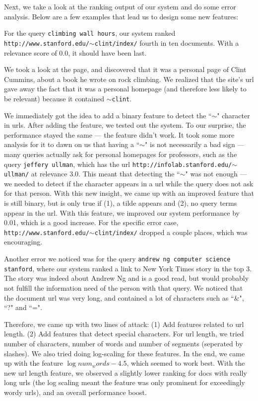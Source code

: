 \documentclass[10pt,twocolumn]{article}
\begin{document}
Next, we take a look at the ranking output of our system and do some error analysis. Below are a few examples that lead us to design some new features:

For the query \texttt{climbing wall hours}, our system ranked \texttt{http://www.stanford.edu/$\sim$clint/index/} fourth in ten documents. With a relevance score of 0.0, it should have been last.

We took a look at the page, and discovered that it was a personal page of Clint Cummins, about a book he wrote on rock climbing. We realized that the site's url gave away the fact that it was a personal homepage (and therefore less likely to be relevant) because it contained \texttt{$\sim$clint}.

We immediately got the idea to add a binary feature to detect the ``$\sim$" character in urls. After adding the feature, we tested out the system. To our surprise, the performance stayed the same --- the feature didn't work. It took some more analysis for it to dawn on us that having a ``$\sim$" is not necessarily a bad sign --- many queries actually ask for personal homepages for professors, such as the query \texttt{jeffery ullman}, which has the url \texttt{http://infolab.stanford.edu/$\sim$ullman/} at relevance 3.0. This meant that detecting the ``$\sim$" was not enough --- we needed to detect if the character appears in a url while the query does not ask for that person. With this new insight, we came up with an improved feature that is still binary, but is only true if (1), a tilde appears and (2), no query terms appear in the url. With this feature, we improved our system performance by 0.01, which is a good increase. For the specific error case, \texttt{http://www.stanford.edu/$\sim$clint/index/} dropped a couple places, which was encouraging. 

Another error we noticed was for the query \texttt{andrew ng computer science stanford}, where our system ranked a link to New York Times story in the top 3. The story was indeed about Andrew Ng and is a good read, but would probably not fulfill the information need of the person with that query. We noticed that the document url was very long, and contained a lot of characters such as ``\&", ``?" and ``=".

Therefore, we came up with two lines of attack: (1) Add features related to url length. (2) Add features that detect special characters. For url length, we tried number of characters, number of words and number of segments (seperated by slashes). We also tried doing log-scaling for these features. In the end, we came up with the feature $\log{num_words-4.5}$, which seemed to work best. With the new url length feature, we observed a slightly lower ranking for docs with really long urls (the log scaling meant the feature was only prominent for exceedingly wordy urls), and an overall performance boost.
\end{document}
